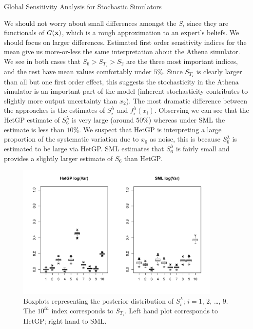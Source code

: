 \begin{chapter}{Global Sensitivity Analysis for Stochastic Simulators\label{Ch:sensitivity}}
\begin{figure}[ht]
\end{figure}
We should not worry about small differences amongst the $S_i$ since they are functionals of $G(\mathbf{x})$, which is a rough approximation to an expert's beliefs. We should focus on larger differences. Estimated first order sensitivity indices for the mean give us more-or-less the same interpretation about the Athena simulator. We see in both cases that $S_6  > S_{T_\varepsilon} > S_2$ are the three most important indices, and the rest have mean values comfortably under $5\%$. Since $S_{T_\varepsilon}$ is clearly larger than all but one first order effect, this suggests the stochasticity in the Athena simulator is an important part of the model (inherent stochasticity contributes to slightly more output uncertainty than $x_2$).
 The most dramatic difference between the approaches is the estimates of $S^{\lambda}_i$ and $f^{\lambda}_i(x_i)$. Observing  we can see that the HetGP estimate of $S^{\lambda}_6$ is very large (around $50\%$) whereas under SML the estimate is less than $10\%$. We suspect that HetGP is interpreting a large proportion of the systematic variation due to $x_6$ as noise, this is because $S_6^{\lambda}$ is estimated to be large via HetGP. SML estimates that $S_6^{\lambda}$ is fairly small and provides a slightly larger estimate of $S_6$ than HetGP.
\begin{figure}[ht]
  \centering
  \includegraphics[width=0.9\textwidth]{fig-sensitivity/si-var4.pdf}
  \caption{Boxplots representing the posterior distribution of $S_i^{\lambda}$; $i=1$, $2$, \ldots, $9$. The $10^{th}$ index corresponds to $S_{T_\varepsilon}$. Left hand plot corresponds to HetGP; right hand to SML.}
   \label{Fig:si-var}
\end{figure}
\begin{figure}[ht]

\end{figure}
\end{chapter}
